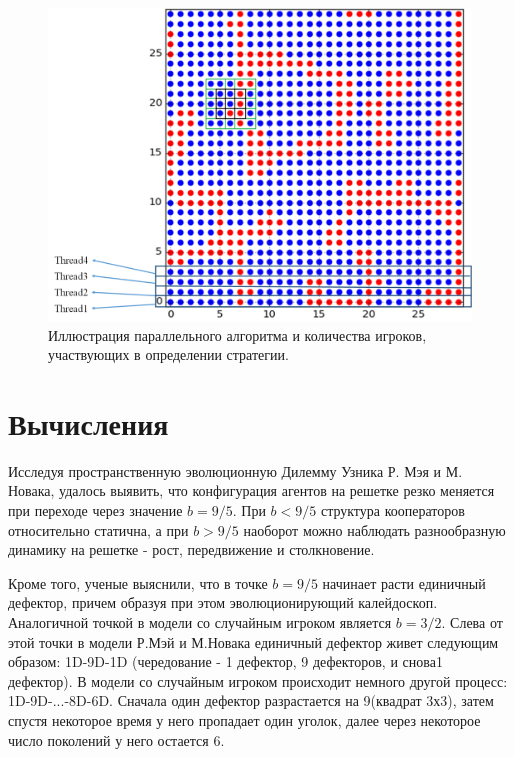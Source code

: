 \documentclass[12pt,a4paper]{article}
\begin{document}
	\begin{figure}[H]
		\label{parall}
		\centering
		\includegraphics[width=0.7\linewidth]{rule.png}
		\caption{Иллюстрация параллельного алгоритма и количества игроков, участвующих в определении стратегии.}
	\end{figure}
	
	\section{Вычисления}
	
	\par Исследуя пространственную эволюционную Дилемму Узника Р. Мэя и М. Новака, удалось выявить, что конфигурация агентов на решетке резко меняется при переходе через значение $b = 9/5$. При $b<9/5$ структура кооператоров относительно статична, а при $b>9/5$ наоборот можно наблюдать разнообразную динамику на решетке - рост, передвижение и столкновение.
	
	\par Кроме того, ученые выяснили, что в точке $b=9/5$ начинает расти единичный дефектор, причем образуя при этом эволюционирующий калейдоскоп. Аналогичной точкой в модели со случайным игроком является $b=3/2$. Слева от этой точки в модели Р.Мэй и М.Новака единичный дефектор живет следующим образом: 1D-9D-1D (чередование - 1 дефектор, 9 дефекторов, и снова1 дефектор). В модели со случайным игроком происходит немного другой процесс: 1D-9D-...-8D-6D. Сначала один дефектор разрастается на 9(квадрат 3х3), затем спустя некоторое время у него пропадает один уголок, далее через некоторое число поколений у него остается 6.
	
\end{document}
